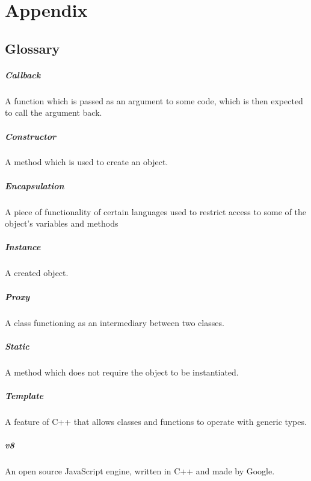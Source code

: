 \chapter{Appendix}


\section{Glossary}
\paragraph{Callback}
A function which is passed as an argument to some code, which is then expected to call the argument back.
\paragraph{Constructor}
A method which is used to create an object.
\paragraph{Encapsulation}
A piece of functionality of certain languages used to restrict access to some of the object's variables and methods
\paragraph{Instance}
A created object.
\paragraph{Proxy}
A class functioning as an intermediary between two classes.
\paragraph{Static}
A method which does not require the object to be instantiated.
\paragraph{Template} 
A feature of C++ that allows classes and functions to operate with generic types.
\paragraph{v8} 
An open source JavaScript engine, written in C++ and made by Google.


